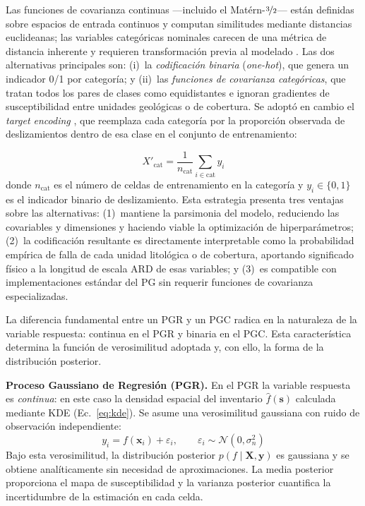 \documentclass[letterpaper,11pt]{tec}
\begin{document}
{Las funciones de covarianza continuas ---incluido el Matérn-$\nicefrac{3}{2}$--- están definidas sobre espacios de entrada continuos y
computan similitudes mediante distancias euclideanas; las variables categóricas nominales carecen de una métrica de distancia
inherente y requieren transformación previa al modelado \citep{GarridoMerchan2020, Rasmussen2006}. Las dos alternativas
principales son: (i)~la \textit{codificación binaria} (\textit{one-hot}), que genera un indicador 0/1 por categoría; y 
(ii)~las \textit{funciones de covarianza categóricas}, que tratan todos los pares de clases como
equidistantes e ignoran gradientes de susceptibilidad entre unidades geológicas o de cobertura. Se adoptó en cambio el
 \textit{target encoding} \citep{MicciBarreca2001}, que reemplaza cada categoría por la proporción
observada de deslizamientos dentro de esa clase en el conjunto de entrenamiento:

\begin{equation}
    X'_{\mathrm{cat}} = \frac{1}{n_{\mathrm{cat}}} \sum_{i \in \mathrm{cat}} y_i
    \label{eq:target}
\end{equation}
donde $n_{\mathrm{cat}}$ es el número de celdas de entrenamiento en la categoría y $y_i \in \{0,1\}$ es el indicador binario de
deslizamiento. Esta estrategia presenta tres ventajas sobre las alternativas: (1)~mantiene la parsimonia del modelo, reduciendo
las covariables y dimensiones y haciendo viable la optimización de hiperparámetros; (2)~la codificación resultante es directamente
interpretable como la probabilidad empírica de falla de cada unidad litológica o de cobertura, aportando significado físico a la
longitud de escala ARD de esas variables; y (3)~es compatible con implementaciones estándar del PG sin requerir funciones de covarianza
especializadas.

La diferencia fundamental entre un PGR y un PGC radica en la naturaleza de la variable respuesta: continua
en el PGR y binaria en el PGC. Esta característica determina la función de verosimilitud adoptada y, con
ello, la forma de la distribución posterior.

\textbf{Proceso Gaussiano de Regresión (PGR).} En el PGR la variable respuesta es
\textit{continua}: en este caso la densidad espacial del inventario $\hat{f}(\mathbf{s})$ calculada mediante KDE
(Ec.~\ref{eq:kde}). Se asume una verosimilitud gaussiana con ruido de observación independiente:
\begin{equation}
    y_i = f(\mathbf{x}_i) + \varepsilon_i, \qquad \varepsilon_i \sim \mathcal{N}(0,\sigma_n^2)
    \label{eq:pgr}
\end{equation}
Bajo esta verosimilitud, la distribución posterior $p(f\mid\mathbf{X},\mathbf{y})$ es gaussiana y se
obtiene analíticamente sin necesidad de aproximaciones. La media posterior proporciona el mapa de
susceptibilidad y la varianza posterior cuantifica la incertidumbre de la estimación en cada celda.

}
\end{document}
